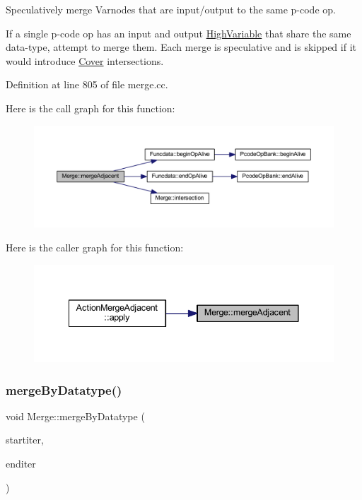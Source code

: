 Speculatively merge Varnodes that are input/output to the same p-\/code op. 

If a single p-\/code op has an input and output \mbox{\hyperlink{class_high_variable}{High\+Variable}} that share the same data-\/type, attempt to merge them. Each merge is speculative and is skipped if it would introduce \mbox{\hyperlink{class_cover}{Cover}} intersections. 

Definition at line 805 of file merge.\+cc.

Here is the call graph for this function\+:
\nopagebreak
\begin{figure}[H]
\begin{center}
\leavevmode
\includegraphics[width=350pt]{class_merge_a79f377000da91c9e50b89307fa88d268_cgraph}
\end{center}
\end{figure}
Here is the caller graph for this function\+:
\nopagebreak
\begin{figure}[H]
\begin{center}
\leavevmode
\includegraphics[width=341pt]{class_merge_a79f377000da91c9e50b89307fa88d268_icgraph}
\end{center}
\end{figure}
\mbox{\label{class_merge_a319ac2d65a6dff86cbfda772d047b2e1}} 
\subsubsection{\texorpdfstring{mergeByDatatype()}{mergeByDatatype()}}
{\footnotesize\ttfamily void Merge\+::merge\+By\+Datatype (\begin{DoxyParamCaption}\item[{Varnode\+Loc\+Set\+::const\+\_\+iterator}]{startiter,  }\item[{Varnode\+Loc\+Set\+::const\+\_\+iterator}]{enditer }\end{DoxyParamCaption})}



